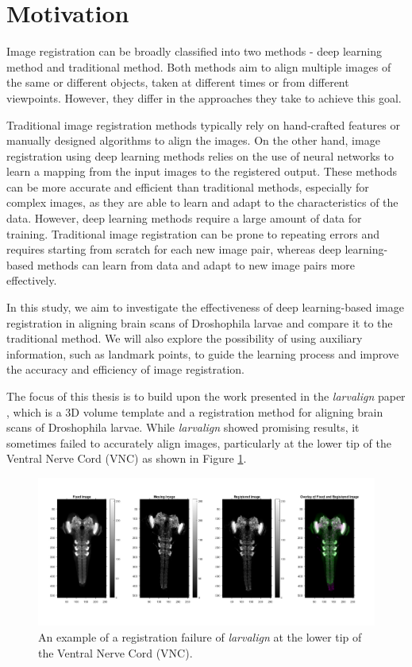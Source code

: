 \documentclass{book}
\begin{document}
	\section{Motivation} \label{sec:motivation}
	Image registration can be broadly classified into two methods - deep learning method and traditional method. Both methods aim to align multiple images of the same or different objects, taken at different times or from different viewpoints. However, they differ in the approaches they take to achieve this goal.
	
	Traditional image registration methods typically rely on hand-crafted features or manually designed algorithms to align the images. On the other hand, image registration using deep learning methods relies on the use of neural networks to learn a mapping from the input images to the registered output. These methods can be more accurate and efficient than traditional methods, especially for complex images, as they are able to learn and adapt to the characteristics of the data. However, deep learning methods require a large amount of data for training. Traditional image registration can be prone to repeating errors and requires starting from scratch for each new image pair, whereas deep learning-based methods can learn from data and adapt to new image pairs more effectively.
	
	In this study, we aim to investigate the effectiveness of deep learning-based image registration in aligning brain scans of Droshophila larvae and compare it to the traditional method. We will also explore the possibility of using auxiliary information, such as landmark points, to guide the learning process and improve the accuracy and efficiency of image registration.
	
	The focus of this thesis is to build upon the work presented in the \textit{larvalign} paper \cite{larvalign}, which is a 3D volume template and a registration method for aligning brain scans of Droshophila larvae. While \textit{larvalign} showed promising results, it sometimes failed to accurately align images, particularly at the lower tip of the Ventral Nerve Cord (VNC) as shown in Figure \ref{fig:Registraion_Failure}.
	
	\begin{figure}[h!]
		\centering
		\includegraphics[width=\linewidth]{resources/motivation_fig_1.jpg}
		\caption{An example of a registration failure of \textit{larvalign} \cite{larvalign} at the lower tip of the Ventral Nerve Cord (VNC).}
		\label{fig:Registraion_Failure}
	\end{figure}
	
\end{document}
